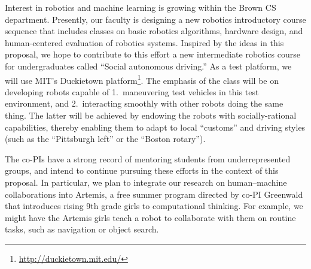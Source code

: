 Interest in robotics and machine learning is growing within the Brown
CS department.  Presently, our faculty is designing a new robotics
introductory course sequence that includes classes on basic robotics
algorithms, hardware design, and human-centered evaluation of robotics
systems.  Inspired by the ideas in this proposal, we hope to
contribute to this effort a new intermediate robotics course for
undergraduates called ``Social autonomous driving.''  As a test
platform, we will use MIT's Duckietown
platform\footnote{\url{http://duckietown.mit.edu/}}.  The emphasis of the class will be on developing robots
capable of 1.~maneuvering test vehicles in this test environment, and
2.~interacting smoothly with other robots doing the same thing.
%
%
The latter will be achieved by endowing the robots with
socially-rational capabilities, thereby enabling them to adapt to
local ``customs'' and driving styles (such as the ``Pittsburgh left''
or the ``Boston rotary'').



The co-PIs have a strong record of mentoring students from
underrepresented groups, and intend to continue pursuing these efforts
in the context of this proposal.  In particular, we plan to integrate
our research on human--machine collaborations into Artemis, a free
summer program directed by co-PI Greenwald that introduces rising 9th
grade girls to computational thinking.  For example, we might have the
Artemis girls teach a robot to collaborate with them on routine tasks,
such as navigation or object search.


